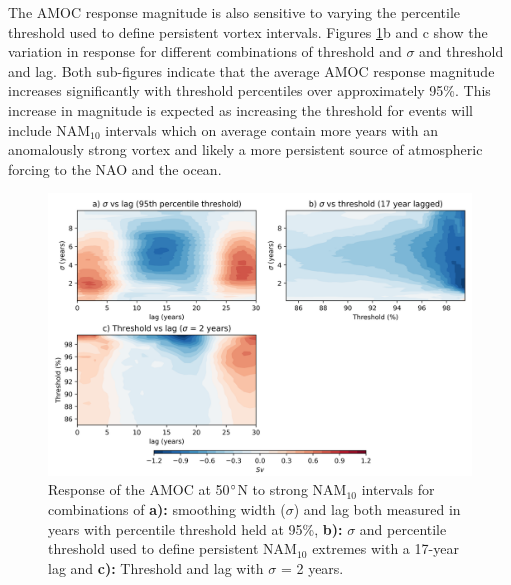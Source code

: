 The AMOC response magnitude is also sensitive to varying the percentile threshold used to define persistent vortex intervals. Figures \ref{sensitivity}b and c show the variation in response for different combinations of threshold and $\sigma$ and threshold and lag. Both sub-figures indicate that the average AMOC response magnitude increases significantly with threshold percentiles over approximately 95\%. This increase in magnitude is expected as increasing the threshold for events will include NAM$_{10}$ intervals which on average contain more years with an anomalously strong vortex and likely a more persistent source of atmospheric forcing to the NAO and the ocean. 

\begin{figure}[h!]
\begin{center}
\noindent\includegraphics[width =\linewidth]{Figures/Figures-surface/sensitivity_contours_strong.png} 
\caption[Response of the AMOC at 50$\degree$N to strong NAM$_{10}$ intervals for combinations of $\sigma$, threshold and lag]{Response of the AMOC at 50$\degree$N to strong NAM$_{10}$ intervals for combinations of \textbf{a):} smoothing width ($\sigma$) and lag both measured in years with percentile threshold held at 95\%, \textbf{b):} $\sigma$ and percentile threshold used to define persistent NAM$_{10}$ extremes with a 17-year lag and \textbf{c):} Threshold and lag with $\sigma$ = 2 years.}
\label{sensitivity}
\end{center}
\end{figure}

